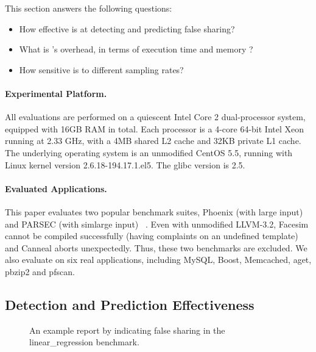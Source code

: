 


\label{sec:evaluation}

This section answers the following questions:
\begin{itemize}
\item
  How effective is \Predator{} at detecting and predicting false sharing?

\item
  What is \Predator{}'s overhead, in terms of execution time and memory ?

\item
  How sensitive is \Predator{} to different sampling rates?
 
\end{itemize}

\paragraph{Experimental Platform.} All evaluations are performed on a quiescent Intel Core 2 dual-processor system,  equipped with 16GB RAM in total. Each processor is a 4-core 64-bit Intel Xeon running at 2.33 GHz, with a 4MB shared L2 cache and 32KB private L1 cache. The underlying operating system is an unmodified CentOS 5.5, running with Linux kernel version 2.6.18-194.17.1.el5. The glibc version is 2.5. 

\paragraph{Evaluated Applications.}
This paper evaluates two popular benchmark suites,
Phoenix (with large input) ~\cite{phoenix-hpca} and PARSEC (with simlarge input) ~\cite{parsec}. Even with unmodified LLVM-3.2, Facesim cannot be compiled successfully (having complaints on an undefined template) and Canneal aborts unexpectedly. Thus, these two benchmarks are excluded.
We also evaluate \Predator{} on six real applications, including MySQL, Boost, Memcached, aget, pbzip2 and pfscan.



\subsection{Detection and Prediction Effectiveness}
\label{sec:predatoreffective}

\begin{figure}[htb]
{\centering
\tiny
\subfigure{}
\caption{An example report by \Predator{} indicating false sharing in the linear\_regression benchmark.
\label{fig:lrreport}}
}
\end{figure}

